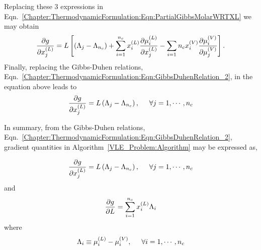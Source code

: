 Replacing these 3 expressions in Eqn.~\ref{Chapter:ThermodynamicFormulation:Eqn:PartialGibbsMolarWRTXL} we may obtain
\begin{equation}
    \frc{\partial g}{\partial\mfr[x]{j}{L}} = L\left[\left(\Lambda_{j}-\Lambda_{n_{c}}\right) + \summation_{i=1}^{n_{c}}\mfr[x]{i}{L}\frc{\partial\mfr[\mu]{i}{L}}{\partial\mfr[x]{j}{L}} - \summation_{i=1}{n_{c}}\mfr[x]{i}{V}\frc{\partial\mfr[\mu]{i}{V}}{\partial\mfr[\mu]{j}{V}}\right].
\end{equation}
Finally, replacing the Gibbs-Duhen relations, Eqn.~\ref{Chapter:ThermodynamicFormulation:Eqn:GibbsDuhenRelation_2}, in the equation above leads to
   \begin{equation}
        \frc{\partial g}{\partial\mfr[x]{j}{L}} = L\left(\Lambda_{j}-\Lambda_{n_{c}}\right), \hspace{.5cm} \forall j=1, \cdots, n_{c} \label{Chapter:ThermodynamicFormulation:Eqn:PartialGibbsMolarWRTXL_2}
   \end{equation}

In summary, from the Gibbs-Duhen relations, Eqn.~\ref{Chapter:ThermodynamicFormulation:Eqn:GibbsDuhenRelation_2}, gradient quantities in Algorithm~\ref{VLE_Problem:Algorithm} may be expressed as,

\begin{shaded}

\begin{displaymath}
 \frc{\partial g}{\partial\mfr[x]{j}{L}} = L\left(\Lambda_{j}-\Lambda_{n_{c}}\right), \hspace{0.5cm} \forall j=1, \cdots, n_{c}
\end{displaymath}
and
\begin{displaymath}
 \frc{\partial g}{\partial L} = \summation_{i=1}^{n_{c}}\mfr[x]{i}{L}\Lambda_{i}
\end{displaymath}
where
\begin{displaymath}
   \Lambda_{i} \equiv \mfr[\mu]{i}{L} - \mfr[\mu]{i}{V}, \hspace{.5cm} \forall i=1, \cdots, n_{c}
\end{displaymath}

\end{shaded}


